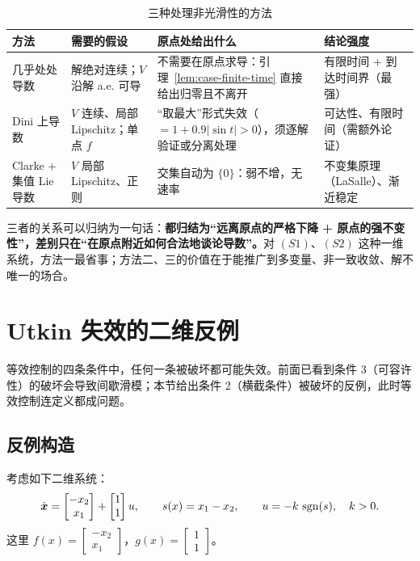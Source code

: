 \begin{table}[!htb]
  \centering
  \small
  \begin{tabular}{@{}p{2.6cm}|p{3.6cm}|p{3.6cm}|p{3.4cm}@{}}
    \hline
    方法 & 需要的假设 & 原点处给出什么 & 结论强度 \\
    \hline
    几乎处处导数 & 解绝对连续；$V$ 沿解 a.e. 可导 & 不需要在原点求导：引理~\ref{lem:case-finite-time} 直接给出归零且不离开 & 有限时间 + 到达时间界（最强） \\
    \hline
    Dini 上导数 & $V$ 连续、局部 Lipschitz；单点 $f$ & “取最大”形式失效（$=1+0.9|\sin t|>0$），须逐解验证或分离处理 & 可达性、有限时间（需额外论证） \\
    \hline
    Clarke + 集值 Lie 导数 & $V$ 局部 Lipschitz、正则 & 交集自动为 $\{0\}$：弱不增，无速率 & 不变集原理（LaSalle）、渐近稳定 \\
    \hline
  \end{tabular}
  \caption{三种处理非光滑性的方法}
  \label{tab:case-methods}
\end{table}

三者的关系可以归纳为一句话：\textbf{都归结为“远离原点的严格下降 + 原点的强不变性”，差别只在“在原点附近如何合法地谈论导数”。}对 $(S1)$、$(S2)$ 这种一维系统，方法一最省事；方法二、三的价值在于能推广到多变量、非一致收敛、解不唯一的场合。

\section{Utkin 失效的二维反例}\label{sec:utkin-counterexample}

等效控制的四条条件中，任何一条被破坏都可能失效。前面已看到条件 3（可容许性）的破坏会导致间歇滑模；本节给出条件 2（横截条件）被破坏的反例，此时等效控制连定义都成问题。

\subsection{反例构造}

考虑如下二维系统：
\[
\dot{\boldsymbol x} = \begin{bmatrix} -x_2 \\ x_1 \end{bmatrix} + \begin{bmatrix} 1 \\ 1 \end{bmatrix} u,
\qquad
s(x) = x_1 - x_2,
\qquad
u = -k\,\operatorname{sgn}(s),\quad k>0.
\]
这里 $f(x) = \begin{bmatrix} -x_2 \\ x_1 \end{bmatrix}$，$g(x) = \begin{bmatrix} 1 \\ 1 \end{bmatrix}$。

